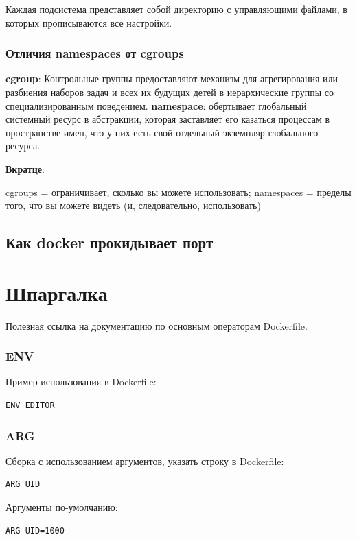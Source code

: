 Каждая подсистема представляет собой директорию с управляющими файлами, в которых прописываются все настройки.  

\subsection{Отличия namespaces от cgroups}

\textbf{cgroup}: Контрольные группы предоставляют механизм для агрегирования или разбиения наборов задач и всех их будущих детей в иерархические группы со специализированным поведением.
\textbf{namespace}: обертывает глобальный системный ресурс в абстракции, которая заставляет его казаться процессам в пространстве имен, что у них есть свой отдельный экземпляр глобального ресурса.

\textbf{Вкратце}:

 cgroups = ограничивает, сколько вы можете использовать;
 namespaces = пределы того, что вы можете видеть (и, следовательно, использовать)

\section{Как docker прокидывает порт}

\chapter{Шпаргалка}

Полезная \href{https://docs.docker.com/engine/reference/builder/#usage}{ссылка} на документацию по основным операторам Dockerfile.

\subsection{ENV}

Пример использования в Dockerfile:
\begin{lstlisting}
ENV EDITOR 
\end{lstlisting}

\subsection{ARG}

Сборка с использованием аргументов, указать строку в Dockerfile:
\begin{lstlisting}
ARG UID
\end{lstlisting}

Аргументы по-умолчанию:
\begin{lstlisting}
ARG UID=1000
\end{lstlisting}

